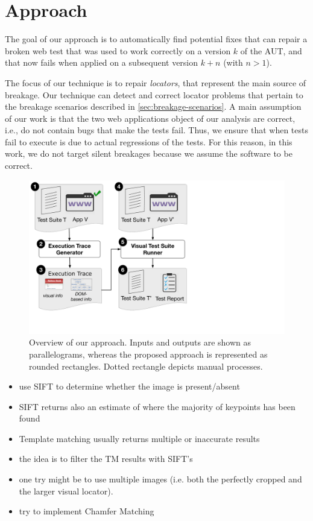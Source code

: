 \section{Approach}\label{sec:approach}

The goal of our approach is to automatically find potential fixes that can repair a broken web test that was used to work correctly on a  version $k$ of the AUT, and that now fails when applied on a subsequent version $k+n$ (with $n>1$).

The focus of our technique is to repair \textit{locators}, that represent the main source of breakage.
Our technique can detect and correct locator problems that pertain to the breakage scenarios described in \autoref{sec:breakage-scenarios}. A main assumption of our work is that the two web applications object of our analysis are correct, i.e., do not contain bugs that make the tests fail. Thus, we ensure that when tests fail to execute is due to actual regressions of the tests. For this reason, in this work, we do not target silent breakages because we assume the software to be correct.

\begin{figure}[t]
\centering
\includegraphics[trim={0.2cm 3.5cm 15cm 0.2cm},clip,scale=0.28]{images/approach-bigger}
\caption{Overview of our approach. Inputs and outputs are shown as parallelograms, whereas the proposed approach is represented as rounded rectangles. Dotted rectangle depicts manual processes.}
\label{approach}
\end{figure}

\begin{itemize}
\item use SIFT to determine whether the image is present/absent
\item SIFT returns also an estimate of where the majority of keypoints has been found
\item Template matching usually returns multiple or inaccurate results
\item the idea is to filter the TM results with SIFT's
\item one try might be to use multiple images (i.e. both the perfectly cropped and the larger visual locator).
\item try to implement Chamfer Matching
\end{itemize}

